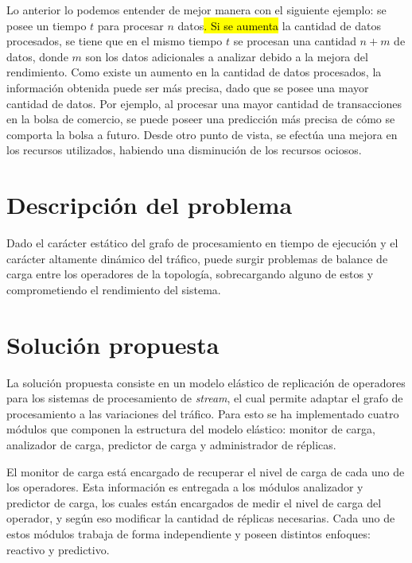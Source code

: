 Lo anterior lo podemos entender de mejor manera con el siguiente ejemplo: se posee un tiempo $t$ para procesar $n$ datos\hl{. Si se aumenta} la cantidad de datos procesados, se tiene que en el mismo tiempo $t$ se procesan una cantidad $n+m$ de datos, donde $m$ son los datos adicionales a analizar debido a la mejora del rendimiento. Como existe un aumento en la cantidad de datos procesados, la información obtenida puede ser más precisa, dado que se posee una mayor cantidad de datos. Por ejemplo, al procesar una mayor cantidad de transacciones en la bolsa de comercio, se puede poseer una predicción más precisa de cómo se comporta la bolsa a futuro. Desde otro punto de vista, se efectúa una mejora en los recursos utilizados, habiendo una disminución de los recursos ociosos.

\section{Descripción del problema}
\label{intro:problema}


Dado el carácter estático del grafo de procesamiento en tiempo de ejecución y el carácter altamente dinámico del tráfico, puede surgir problemas de balance de carga entre los operadores de la topología, sobrecargando alguno de estos y comprometiendo el rendimiento del sistema.

\section{Solución propuesta}
\label{intro:solucion}

La solución propuesta consiste en un modelo elástico de replicación de operadores para los sistemas de procesamiento de \textit{stream}, el cual permite adaptar el grafo de procesamiento a las variaciones del tráfico. Para esto se ha implementado cuatro módulos que componen la estructura del modelo elástico: monitor de carga, analizador de carga, predictor de carga y administrador de réplicas.

El monitor de carga está encargado de recuperar el nivel de carga de cada uno de los operadores. Esta información es entregada a los módulos analizador y predictor de carga, los cuales están encargados de medir el nivel de carga del operador, y según eso modificar la cantidad de réplicas necesarias. Cada uno de estos módulos trabaja de forma independiente y poseen distintos enfoques: reactivo y predictivo.

